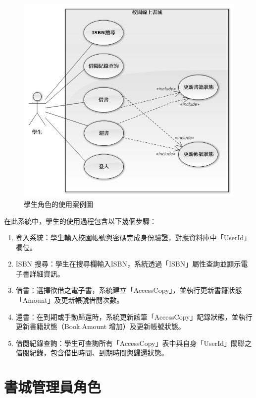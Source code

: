 \begin{figure}[ht]
    \centering
    \includegraphics[width=\linewidth]{image/使用案例：學生.png}
    \captionsetup{justification=centering}
    \caption{學生角色的使用案例圖}
\end{figure}

在此系統中，學生的使用過程包含以下幾個步驟：
\begin{enumerate}
    \item 登入系統：學生輸入校園帳號與密碼完成身份驗證，對應資料庫中「UserId」欄位。
    \item ISBN 搜尋：學生在搜尋欄輸入ISBN，系統透過「ISBN」屬性查詢並顯示電子書詳細資訊。
    \item 借書：選擇欲借之電子書，系統建立「AccessCopy」，並執行更新書籍狀態「Amount」及更新帳號借閱次數。
    \item 還書：在到期或手動歸還時，系統更新該筆「AccessCopy」記錄狀態，並執行更新書籍狀態（Book.Amount 增加）及更新帳號狀態。
    \item 借閱紀錄查詢：學生可查詢所有「AccessCopy」表中與自身「UserId」關聯之借閱紀錄，包含借出時間、到期時間與歸還狀態。
\end{enumerate}

\clearpage

\section{書城管理員角色}

